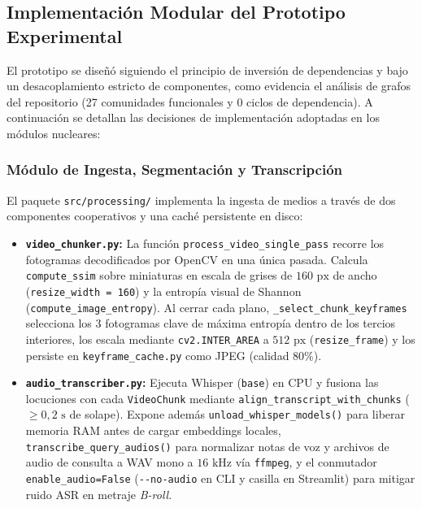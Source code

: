 \subsection{Implementación Modular del Prototipo Experimental}
\label{subsec:implementacion_modular_prototipo}

El prototipo se diseñó siguiendo el principio de inversión de dependencias y bajo un desacoplamiento estricto de componentes, como evidencia el análisis de grafos del repositorio (27 comunidades funcionales y 0 ciclos de dependencia). A continuación se detallan las decisiones de implementación adoptadas en los módulos nucleares:

\subsubsection{Módulo de Ingesta, Segmentación y Transcripción}
El paquete \texttt{src/processing/} implementa la ingesta de medios a través de dos componentes cooperativos y una caché persistente en disco:
\begin{itemize}
    \item \textbf{\texttt{video\_chunker.py}:} La función \texttt{process\_video\_single\_pass} recorre los fotogramas decodificados por OpenCV en una única pasada. Calcula \texttt{compute\_ssim} sobre miniaturas en escala de grises de $160\text{ px}$ de ancho (\texttt{resize\_width = 160}) y la entropía visual de Shannon (\texttt{compute\_image\_entropy}). Al cerrar cada plano, \texttt{\_select\_chunk\_keyframes} selecciona los $3$ fotogramas clave de máxima entropía dentro de los tercios interiores, los escala mediante \texttt{cv2.INTER\_AREA} a $512\text{ px}$ (\texttt{resize\_frame}) y los persiste en \texttt{keyframe\_cache.py} como JPEG (calidad $80\%$).
    \item \textbf{\texttt{audio\_transcriber.py}:} Ejecuta Whisper (\texttt{base}) en CPU y fusiona las locuciones con cada \texttt{VideoChunk} mediante \texttt{align\_\allowbreak transcript\_\allowbreak with\_\allowbreak chunks} ($\ge 0,2\text{ s}$ de solape). Expone además \texttt{unload\_\allowbreak whisper\_\allowbreak models()} para liberar memoria RAM antes de cargar embeddings locales, \texttt{transcribe\_\allowbreak query\_\allowbreak audios()} para normalizar notas de voz y archivos de audio de consulta a WAV mono a $16\text{ kHz}$ vía \texttt{ffmpeg}, y el conmutador \texttt{enable\_audio=False} (\texttt{-{}-no-audio} en CLI y casilla en Streamlit) para mitigar ruido ASR en metraje \textit{B-roll}.
\end{itemize}

